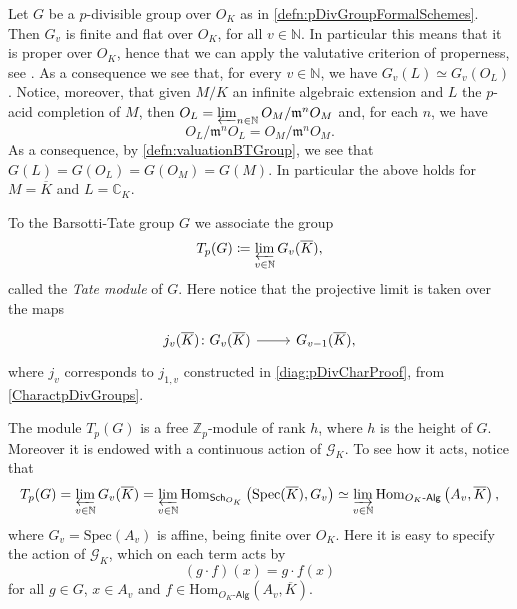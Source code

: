 \begin{rem}[]\label{VCPBTGroups}
	Let $G$ be a $p$-divisible group over $O_K$ as in \cref{defn:pDivGroupFormalSchemes}.
	Then $G_v$ is finite and flat over $O_K$, for all $v \in \mathbb{N}$. 
	In particular this means that it is proper over $O_K$, hence
	that we can apply the valutative criterion of properness,
	see \cite[Chapter II, theorem 4.7]{Hartshorne}.
	As a consequence we see that, for every $v \in \mathbb{N}$, we have
	$G_v(L) \simeq G_v(O_L)$.
	Notice, moreover, that given $M/K$ an infinite algebraic extension
	and $L$ the $p$-acid completion of $M$, then
	$O_L = \varprojlim_{n \in \mathbb{N}}O_M/\mathfrak{m}^nO_M$
	and, for each $n$, we have
	\begin{equation*}
	O_L/\mathfrak{m}^nO_L = O_M/\mathfrak{m}^nO_M
	.\end{equation*}
	As a consequence, by \cref{defn:valuationBTGroup}, we see that
	$G(L) = G(O_L) = G(O_M) = G(M)$.
	In particular the above holds for $M = \overline{K}$ and $L = \mathbb{C}_K$.
\end{rem}


\begin{defn}
	To the Barsotti-Tate group $G$ we associate the group
	\begin{equation*}
		T_p(G) \coloneqq \varprojlim_{v \in \mathbb{N}} G_v(\overline{K})
	,\end{equation*}
	called the {\em Tate module} of $G$.
	Here notice that the projective limit is taken over the maps
	\begin{equation*}
	\begin{tikzcd}[row sep = 0ex
		,/tikz/column 1/.append style={anchor=base east}
		,/tikz/column 2/.append style={anchor=base west}]
		j_v(\overline{K})\colon 
		G_v(\overline{K})\arrow[r, "", rightarrow] &
		G_{v-1}(\overline{K})
	,\end{tikzcd}
	\end{equation*} 
	where $j_v$ corresponds to $j_{1,v}$ constructed in
	\cref{diag:pDivCharProof}, from \cref{CharactpDivGroups}.
\end{defn}


\begin{rem}[]
	The module $T_p(G)$ is a free $\mathbb{Z}_{p}$-module of rank $h$,
	where $h$ is the height of $G$.
	Moreover it is endowed with a continuous action of $\mathscr{G}_K$.
	To see how it acts, notice that
	\begin{equation*}
		T_p(G) = \varprojlim_{v \in \mathbb{N}} G_v(\overline{K}) =
		\varprojlim_{v \in \mathbb{N}} \mathrm{Hom}_{ \mathsf{Sch}_{ O_K } } 
		\left( \mathrm{Spec}(\overline{K}), G_v \right) \simeq
		\varinjlim_{v \in \mathbb{N}} \mathrm{Hom}_{ O_K\text{-}\mathsf{Alg} }
		\left( A_v, \overline{K} \right)
	,\end{equation*}
	where $G_v = \mathrm{Spec}(A_v)$ is affine, being finite over $O_K$.
	Here it is easy to specify the action of $\mathscr{G}_K$, which on each term acts by
	\begin{equation*}
		\left( g \cdot f \right)(x) = g \cdot f(x)
	\end{equation*}
	for all $g \in G$, $x \in A_v$ and $f \in \mathrm{Hom}_{ O_K\text{-}\mathsf{Alg} } 
	\left( A_v, \overline{K}\right)$.
\end{rem}


